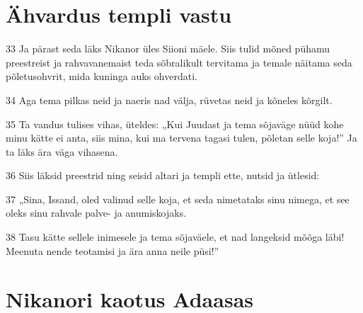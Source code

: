 \section*{Ähvardus templi vastu}

\par 33 Ja pärast seda läks Nikanor üles Siioni mäele. Siis tulid mõned pühamu preestreist ja rahvavanemaist teda sõbralikult tervitama ja temale näitama seda põletusohvrit, mida kuninga auks ohverdati.
\par 34 Aga tema pilkas neid ja naeris nad välja, rüvetas neid ja kõneles kõrgilt.
\par 35 Ta vandus tulises vihas, üteldes: „Kui Juudast ja tema sõjaväge nüüd kohe minu kätte ei anta, siis mina, kui ma tervena tagasi tulen, põletan selle koja!” Ja ta läks ära väga vihasena.
\par 36 Siis läksid preestrid ning seisid altari ja templi ette, nutsid ja ütlesid:
\par 37 „Sina, Issand, oled valinud selle koja, et seda nimetataks sinu nimega, et see oleks sinu rahvale palve- ja anumiskojaks.
\par 38 Tasu kätte sellele inimesele ja tema sõjaväele, et nad langeksid mõõga läbi! Meenuta nende teotamisi ja ära anna neile püsi!” 

\section*{Nikanori kaotus Adaasas}

